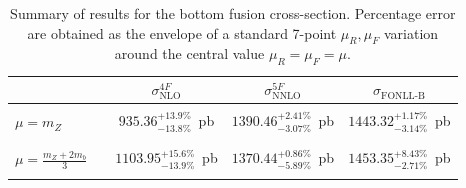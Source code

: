 \documentclass[12pt]{article}
\begin{document}
\begin{table}
  \begin{center}
    \begin{tabular}{lcccc}
      \label{tab:xs-res}
      & & $\scriptstyle \sigma^{4F}_{\text{NLO}}$ & $\scriptstyle \sigma^{5F}_{\text{NNLO}}$ & $\scriptstyle\sigma_{\text{FONLL-B}}$\\
      \hline
      &  &  &    &        \\
      $\scriptstyle\mu = m_Z$ & & $\scriptstyle 935.36^{+13.9\%}_{-13.8\%}$~{\small pb} &
      $\scriptstyle 1390.46^{+2.41\%}_{-3.07\%}$~{\small pb} &
      $\scriptstyle 1443.32^{+1.17\%}_{-3.14\%}$~{\small pb} \\
      &  &  &    &        \\
      \hline
      &  &  &    &        \\
      $\scriptstyle \mu = \frac{m_Z+2m_b}{3}$ & &
      $\scriptstyle 1103.95^{+15.6\%}_{-13.9\%}$~{\small pb}  &
      $\scriptstyle 1370.44^{+0.86\%}_{-5.89\%}$~{\small pb} &
      $\scriptstyle 1453.35^{+8.43\%}_{-2.71\%}$~{\small pb}\\
      &  &  &    &        \\
      \hline 
    \end{tabular}
    \caption{\label{tab:res} Summary of results for the bottom fusion
      cross-section.  Percentage error are
      obtained  as the envelope of a standard 7-point $\mu_R,\mu_F$
      variation around the  central
      value $\mu_R=\mu_F=\mu$.}
  \end{center}
\end{table}



\end{document}

